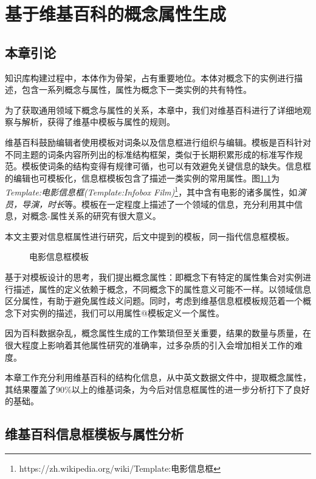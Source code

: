 \chapter{基于维基百科的概念属性生成}
\label{cha:concept-property}

\section{本章引论}

知识库构建过程中，本体作为骨架，占有重要地位。本体对概念下的实例进行描述，包含一系列概念与属性，属性为概念下一类实例的共有特性。

为了获取通用领域下概念与属性的关系，本章中，我们对维基百科进行了详细地观察与解析，获得了维基中模板与属性的规则。

维基百科鼓励编辑者使用模板对词条以及信息框进行组织与编辑。模板是百科针对不同主题的词条内容所列出的标准结构框架，类似于长期积累形成的标准写作规范。模板使词条的结构变得有规律可循，也可以有效避免关键信息的缺失。信息框的编辑也可模板化，信息框模板包含了描述一类实例的常用属性。图\ref{fig:template-infobox-film}为\textit{Template:电影信息框(Template:Infobox Film)}\footnote{https://zh.wikipedia.org/wiki/Template:电影信息框}，其中含有电影的诸多属性，如\textit{演员，导演，时长}等。模板在一定程度上描述了一个领域的信息，充分利用其中信息，对概念-属性关系的研究有很大意义。

本文主要对信息框属性进行研究，后文中提到的模板，同一指代{\heiti 信息框模板}。

\begin{figure}[H]
  \centering
  \caption{电影信息框模板}
  \label{fig:template-infobox-film}
\end{figure}

基于对模板设计的思考，我们提出概念属性：即概念下有特定的属性集合对实例进行描述，属性的定义依赖于概念，不同概念下的属性意义可能不一样。以领域信息区分属性，有助于避免属性歧义问题。同时，考虑到维基信息框模板规范着一个概念下对实例的描述，我们可以用{\heiti 属性@模板}定义一个属性。

因为百科数据杂乱，概念属性生成的工作繁琐但至关重要，结果的数量与质量，在很大程度上影响着其他属性研究的准确率，过多杂质的引入会增加相关工作的难度。

本章工作充分利用维基百科的结构化信息，从中英文数据文件中，提取概念属性，其结果覆盖了90\%以上的维基词条，为今后对信息框属性的进一步分析打下了良好的基础。

\section{维基百科信息框模板与属性分析}
\label{sec:template-analysis}

